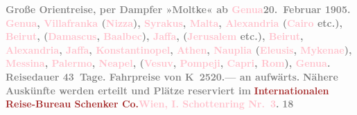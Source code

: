            \textcolor{gray}{\textbf{\textbf{Große Orientreise}, per Dampfer »Moltke« ab \textcolor{pink}{Genua}{}\ledrightnote{\textcolor{pink}{Genua}}{ }\textbf{20. Februar 1905}. \textcolor{pink}{Genua}{}\ledrightnote{\textcolor{pink}{Genua}}, \textcolor{pink}{Villafranka}{}\ledrightnote{\textcolor{pink}{Villefranche-sur-Mer}} (\textcolor{pink}{Nizza}{}\ledrightnote{\textcolor{pink}{Nizza}}), \textcolor{pink}{Syrakus}{}\ledrightnote{\textcolor{pink}{Syrakus}}, \textcolor{pink}{Malta}{}\ledrightnote{\textcolor{pink}{Malta}}, \textcolor{pink}{Alexandria}{}\ledrightnote{\textcolor{pink}{Alexandria}} (\textcolor{pink}{Cairo}{}\ledrightnote{\textcolor{pink}{Kairo}} etc.), \textcolor{pink}{Beirut}{}\ledrightnote{\textcolor{pink}{Beirut}}, (\textcolor{pink}{Damascus}{}\ledrightnote{\textcolor{pink}{Damascus}}, \textcolor{pink}{Baalbec}{}\ledrightnote{\textcolor{pink}{Baalbek}}), \textcolor{pink}{Jaffa}{}\ledrightnote{\textcolor{pink}{Jaffa}}, (\textcolor{pink}{Jerusalem}{}\ledrightnote{\textcolor{pink}{Jerusalem}} etc.), \textcolor{pink}{Beirut}{}\ledrightnote{\textcolor{pink}{Beirut}}, \textcolor{pink}{Alexandria}{}\ledrightnote{\textcolor{pink}{Alexandria}}, \textcolor{pink}{Jaffa}{}\ledrightnote{\textcolor{pink}{Jaffa}}, \textcolor{pink}{Konstantinopel}{}\ledrightnote{\textcolor{pink}{Istanbul}}, \textcolor{pink}{Athen}{}\ledrightnote{\textcolor{pink}{Athen}}, \textcolor{pink}{Nauplia}{}\ledrightnote{\textcolor{pink}{Nafplion}} (\textcolor{pink}{Eleusis}{}\ledrightnote{\textcolor{pink}{Elefsina}}, \textcolor{pink}{Mykenae}{}\ledrightnote{\textcolor{pink}{Mycenae}}), \textcolor{pink}{Messina}{}\ledrightnote{\textcolor{pink}{Messina}}, \textcolor{pink}{Palermo}{}\ledrightnote{\textcolor{pink}{Palermo}}, \textcolor{pink}{Neapel}{}\ledrightnote{\textcolor{pink}{Neapel}}, (\textcolor{pink}{Vesuv}{}\ledrightnote{\textcolor{pink}{Vesuv}}, \textcolor{pink}{Pompeji}{}\ledrightnote{\textcolor{pink}{Pompei}}, \textcolor{pink}{Capri}{}\ledrightnote{\textcolor{pink}{Capri}}, \textcolor{pink}{Rom}{}\ledrightnote{\textcolor{pink}{Rom}}), \textcolor{pink}{Genua}{}\ledrightnote{\textcolor{pink}{Genua}}. Reisedauer 43 Tage.
                  Fahrpreise von \textbf{K 2520.—} an aufwärts.}}\pend
           {\bigskip}\pstart
           \noindent{}\centering{}\textcolor{gray}{\textbf{Nähere Auskünfte werden erteilt und Plätze reserviert im}}\pend
           \pstart
           \noindent{}\textcolor{gray}{\textbf{\textcolor{brown}{Internationalen Reise-Bureau Schenker {\kaufmannsund} Co.}{}\ledrightnote{\textcolor{brown}{Internationales Reise-Bureau Schenker}}{ }\textcolor{pink}{Wien, I. Schottenring Nr. 3}{}\ledrightnote{\textcolor{pink}{Schottenring}}.}}\pend
           \pstart
           \centering{}\textcolor{gray}{\textbf{18}}\pend
           \endnumbering{}  
      